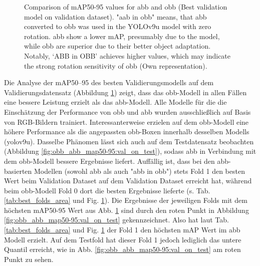 \begin{figure}[htbp]
    \centering
    
    \caption[Comparison of \acrshort{mAP}50-95 values for \acrshort{abb} and \acrshort{obb} (Best validation model on validation dataset)]{Comparison of \acrshort{mAP}50-95 values for \acrshort{abb} and \acrshort{obb} (Best validation model on validation dataset). "aab in obb" means, that \acrlong{abb} converted to obb was used in the \acrshort{YOLO}v9u model with zero rotation. \acrshort{abb} show a lower \acrshort{mAP}, presumably due to the model, while \acrshort{obb} are superior due to their better object adaptation. Notably, ‘ABB in OBB’ achieves higher values, which may indicate the strong rotation sensitivity of \acrshort{obb} (Own representation).}
    \label{fig:obb_abb_map50-95:val_on_val}
\end{figure}
Die Analyse der \acrshort{mAP}50--95 des besten Validierungsmodells auf dem Validierungsdatensatz (Abbildung \ref{fig:obb_abb_map50-95:val_on_val}) zeigt, dass das \acrshort{obb}-Modell in allen Fällen eine bessere Leistung erzielt als das \acrshort{abb}-Modell. Alle Modelle für die die Einschätzung der Performance von \acrshort{obb} und \acrshort{abb} wurden ausschließlich auf Basis von \acrshort{RGB}-Bildern trainiert. Interessanterweise erzielen  auf dem \acrshort{obb}-Modell eine höhere Performance als die angepassten \acrshort{obb}-Boxen innerhalb desselben Modells (yolov9u). Dasselbe Phänomen lässt sich auch auf dem Testdatensatz beobachten (Abbildung \ref{fig:obb_abb_map50-95:val_on_test}), sodass \acrshort{abb} in Verbindung mit dem \acrshort{obb}-Modell bessere Ergebnisse liefert. Auffällig ist, dass bei den \acrshort{abb}-basierten Modellen (sowohl \acrshort{abb} als auch "abb in obb") stets Fold 1 den besten Wert beim Validation Dataset auf dem Validation Dataset erreicht hat, während beim \acrshort{obb}-Modell Fold 0 dort die besten Ergebnisse lieferte (s. Tab. \ref{tab:best_folds_area} und Fig. \ref{fig:obb_abb_map50-95:val_on_val}). Die Ergebnisse der jeweiligen Folds mit dem höchsten \acrshort{mAP}50-95 Wert aus Abb. \ref{fig:obb_abb_map50-95:val_on_val} sind durch den roten Punkt in Abbildung \ref{fig:obb_abb_map50-95:val_on_test} gekennzeichnet. Also hat laut Tab. \ref{tab:best_folds_area} und Fig. \ref{fig:obb_abb_map50-95:val_on_val} der Fold 1 den höchsten \acrshort{mAP} Wert im \acrshort{abb} Modell erzielt. Auf dem Testfold hat dieser Fold 1 jedoch lediglich das untere Quantil erreicht, wie in Abb. \ref{fig:obb_abb_map50-95:val_on_test} am roten Punkt zu sehen. 

